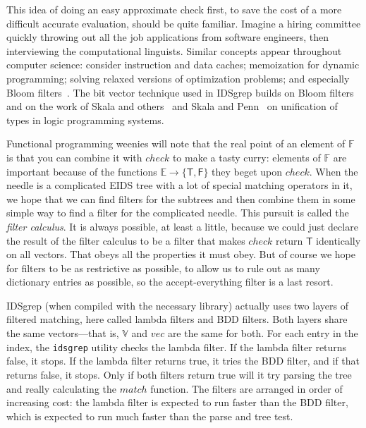 \documentclass[twocolumn]{report}
\begin{document}
This idea of doing an easy approximate check first, to save the cost of a
more difficult accurate evaluation, should be quite familiar.  Imagine a
hiring committee quickly throwing out all the job applications from software
engineers, then interviewing the computational linguists.  Similar concepts
appear throughout computer science: consider instruction and data caches;
memoization for dynamic programming; solving relaxed versions of
optimization problems; and especially Bloom filters~\cite{Bloom:Space}.  The
bit vector technique used in IDSgrep builds on Bloom filters and on the work
of Skala and others~\cite{Skala:Generalized} and Skala and
Penn~\cite{Skala:Approximate} on unification of types in logic programming
systems.

Functional programming weenies will note that the real point of an element
of $\mathbb{F}$ is that you can combine it with $\mathit{check}$ to make a
tasty curry: elements of $\mathbb{F}$ are important because of the functions
$\mathbb{E}\rightarrow\{\mathsf{T},\mathsf{F}\}$ they beget upon
$\mathit{check}$.  When the needle is a complicated EIDS tree with a lot of
special matching operators in it, we hope that we can find filters for the
subtrees and then combine them in some simple way to find a filter for the
complicated needle.  This pursuit is called the \emph{filter calculus}.  It
is always possible, at least a little, because we could just declare the
result of the filter calculus to be a filter that makes $\mathit{check}$
return $\mathsf{T}$ identically on all vectors.  That obeys all the
properties it must obey.  But of course we hope for filters to be as
restrictive as possible, to allow us to rule out as many dictionary entries
as possible, so the accept-everything filter is a last resort.

IDSgrep (when compiled with the necessary library) actually uses two layers
of filtered matching, here called lambda filters and BDD filters.  Both
layers share the same vectors---that is, $\mathbb{V}$ and $\mathit{vec}$ are
the same for both.  For each entry in the index, the \texttt{idsgrep}
utility checks the lambda filter.  If the lambda filter returns false, it
stops.  If the lambda filter returns true, it tries the BDD filter, and if
that returns false, it stops.  Only if both filters return true will it try
parsing the tree and really calculating the $\mathit{match}$ function.  The
filters are arranged in order of increasing cost: the lambda filter is
expected to run faster than the BDD filter, which is expected to run much
faster than the parse and tree test.
\end{document}
